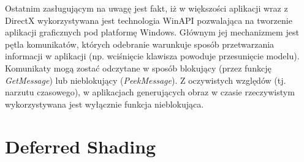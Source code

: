 Ostatnim zasługującym na uwagę jest fakt, iż w większości aplikacji wraz z DirectX wykorzystywana jest technologia WinAPI pozwalająca na tworzenie aplikacji graficznych pod platformę Windows. Głównym jej mechanizmem jest pętla komunikatów, których odebranie warunkuje sposób przetwarzania informacji w aplikacji (np. wciśnięcie klawisza powoduje przesunięcie modelu). Komunikaty mogą zostać odczytane w sposób blokujący (przez funkcję \emph{GetMessage}) lub nieblokujący (\emph{PeekMessage}). Z oczywistych względów (tj. narzutu czasowego), w aplikacjach generujących obraz w czasie rzeczywistym wykorzystywana jest wyłącznie funkcja nieblokująca.

\section{Deferred Shading}

